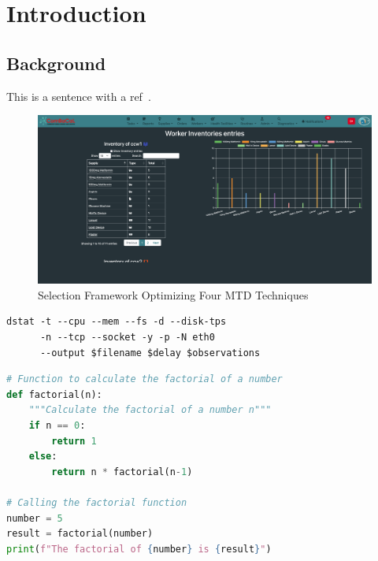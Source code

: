 \section{Introduction}
\subsection{Background}

This is a sentence with a ref~\cite{Aydeger2019UtilizingAttacks}.


\begin{figure}[H]
    \centering
    \includegraphics[trim=0cm 10cm 0.0cm 0cm, clip, width=\linewidth]{assets/images/admin-panel-32-worker-inventories-synced.png}
    \caption{Selection Framework Optimizing Four MTD Techniques}
    \label{fig:architecture}
\end{figure}


\begin{lstlisting}[caption={Measuring System Impact of the Dynamic Analysis using\textit{dstat}},label=measurement]
dstat -t --cpu --mem --fs -d --disk-tps 
      -n --tcp --socket -y -p -N eth0 
      --output $filename $delay $observations
\end{lstlisting}

\begin{lstlisting}[language=Python,caption={Python code to calculate the factorial of a number.}]
# Function to calculate the factorial of a number
def factorial(n):
    """Calculate the factorial of a number n"""
    if n == 0:
        return 1
    else:
        return n * factorial(n-1)

# Calling the factorial function
number = 5
result = factorial(number)
print(f"The factorial of {number} is {result}")
\end{lstlisting}


